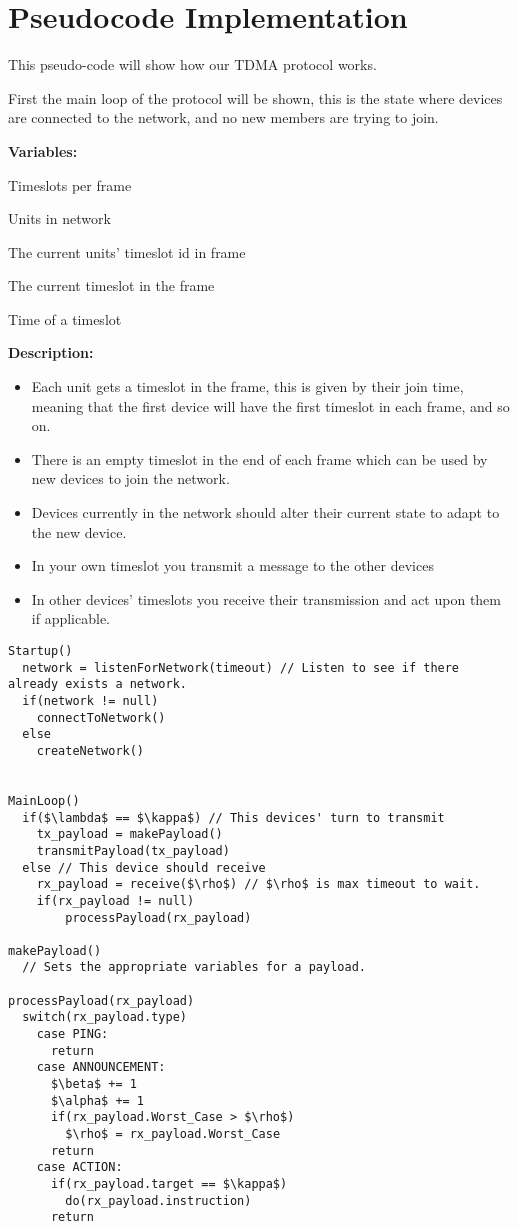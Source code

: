 \section{Pseudocode Implementation}
This pseudo-code will show how our TDMA protocol works.

First the main loop of the protocol will be shown, this is the state where devices are connected to the network, and no new members are trying to join.
\bigskip

\textbf{Variables:} 
\begin{description}[labelindent=\parindent]
    \item[$\alpha$] Timeslots per frame
    \item[$\beta$] Units in network
    \item[$\kappa$] The current units' timeslot id in frame
    \item[$\lambda$] The current timeslot in the frame
    \item[$\rho$] Time of a timeslot
\end{description}
\bigskip

\textbf{Description:}
\begin{itemize}
    \item Each unit gets a timeslot in the frame, this is given by their join time, meaning that the first device will have the first timeslot in each frame, and so on.
    \item There is an empty timeslot in the end of each frame which can be used by new devices to join the network.
    \item Devices currently in the network should alter their current state to adapt to the new device.
    \item In your own timeslot you transmit a message to the other devices
    \item In other devices' timeslots you receive their transmission and act upon them if applicable. 
\end{itemize}

\begin{lstlisting}[mathescape=true]
Startup()
  network = listenForNetwork(timeout) // Listen to see if there already exists a network.
  if(network != null)
    connectToNetwork()
  else 
    createNetwork()
  

MainLoop()
  if($\lambda$ == $\kappa$) // This devices' turn to transmit
  	tx_payload = makePayload()
  	transmitPayload(tx_payload)
  else // This device should receive
  	rx_payload = receive($\rho$) // $\rho$ is max timeout to wait. 
  	if(rx_payload != null)
  	    processPayload(rx_payload)

makePayload() 
  // Sets the appropriate variables for a payload.

processPayload(rx_payload)
  switch(rx_payload.type)
    case PING:
      return
    case ANNOUNCEMENT:
      $\beta$ += 1
      $\alpha$ += 1
      if(rx_payload.Worst_Case > $\rho$)
        $\rho$ = rx_payload.Worst_Case
      return
    case ACTION:
      if(rx_payload.target == $\kappa$)
        do(rx_payload.instruction)
      return
\end{lstlisting}